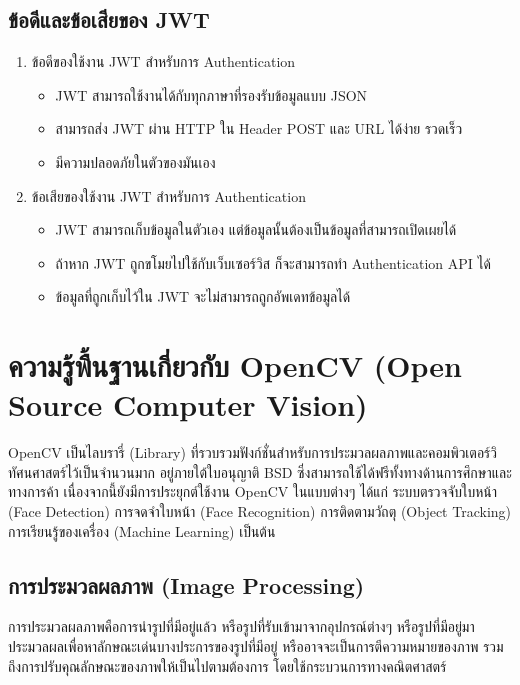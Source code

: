 	\subsection{ข้อดีและข้อเสียของ JWT}
		\begin{enumerate}
			\item ข้อดีของใช้งาน JWT สำหรับการ Authentication
			\begin{itemize}
				\item JWT สามารถใช้งานได้กับทุกภาษาที่รองรับข้อมูลแบบ JSON 
				\item สามารถส่ง JWT ผ่าน HTTP ใน Header POST และ URL ได้ง่าย รวดเร็ว
				\item มีความปลอดภัยในตัวของมันเอง 
			\end{itemize}
			\item ข้อเสียของใช้งาน JWT สำหรับการ Authentication 
			\begin{itemize}
				\item JWT สามารถเก็บข้อมูลในตัวเอง แต่ข้อมูลนั้นต้องเป็นข้อมูลที่สามารถเปิดเผยได้
				\item ถ้าหาก JWT ถูกขโมยไปใช้กับเว็บเซอร์วิส ก็จะสามารถทำ Authentication API ได้
				\item ข้อมูลที่ถูกเก็บไว้ใน JWT จะไม่สามารถถูกอัพเดทข้อมูลได้
			\end{itemize}
		\end{enumerate}
		
			
\section{ความรู้พื้นฐานเกี่ยวกับ OpenCV (Open Source Computer Vision) }
	OpenCV เป็นไลบรารี่ (Library) ที่รวบรวมฟังก์ชั่นสำหรับการประมวลผลภาพและคอมพิวเตอร์วิทัศนศาสตร์ไว้เป็นจำนวนมาก อยู่ภายใต้ใบอนุญาติ BSD ซึ่งสามารถใช้ได้ฟรีทั้งทางด้านการศึกษาและทางการค้า เนื่องจากนี้ยังมีการประยุกต์ใช้งาน OpenCV ในแบบต่างๆ ได้แก่ ระบบตรวจจับใบหน้า (Face Detection) การจดจำใบหน้า (Face Recognition) การติดตามวัถตุ (Object Tracking) การเรียนรู้ของเครื่อง (Machine Learning) เป็นต้น
	\subsection{การประมวลผลภาพ (Image Processing)}
	การประมวลผลภาพคือการนำรูปที่มีอยู่แล้ว หรือรูปที่รับเข้ามาจากอุปกรณ์ต่างๆ 
	หรือรูปที่มีอยู่มาประมวลผลเพื่อหาลักษณะเด่นบางประการของรูปที่มีอยู่ 
	หรืออาจจะเป็นการตีความหมายของภาพ รวมถึงการปรับคุณลักษณะของภาพให้เป็นไปตามต้องการ 
	โดยใช้กระบวนการทางคณิตศาสตร์
	
